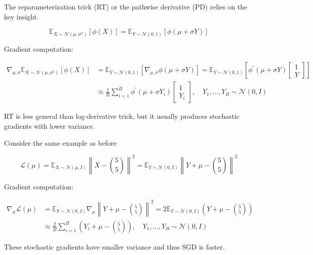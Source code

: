 \begin{definition}
    The reparameterization trick (RT) or the pathwise derivative (PD) relies on the key insight.

    $$
    \mathbb{E}_{X \sim \mathcal{N}\left(\mu, \sigma^{2}\right)}[\phi(X)]=\mathbb{E}_{Y \sim \mathcal{N}(0,1)}[\phi(\mu+\sigma Y)]
    $$

    Gradient computation:

    $$
    \begin{aligned}
    \nabla_{\mu, \sigma} \mathbb{E}_{X \sim \mathcal{N}\left(\mu, \sigma^{2}\right)}[\phi(X)] & =\mathbb{E}_{Y \sim \mathcal{N}(0,1)}\left[\nabla_{\mu, \sigma} \phi(\mu+\sigma Y)\right]=\mathbb{E}_{Y \sim \mathcal{N}(0,1)}\left[\phi^{\prime}(\mu+\sigma Y)\left[\begin{array}{c}
    1 \\
    Y
    \end{array}\right]\right] \\
    & \approx \frac{1}{B} \sum_{i=1}^{B} \phi^{\prime}\left(\mu+\sigma Y_{i}\right)\left[\begin{array}{c}
    1 \\
    Y_{i}
    \end{array}\right], \quad Y_{1}, \ldots, Y_{B} \sim \mathcal{N}(0, I)
    \end{aligned}
    $$

    RT is less general than log-derivative trick, but it usually produces stochastic gradients with lower variance.
\end{definition}

\begin{example}
    Consider the same example as before

    $$
    \mathcal{L}(\mu)=\mathbb{E}_{X \sim \mathcal{N}(\mu, I)}\left\|X-\binom{5}{5}\right\|^{2}=\mathbb{E}_{Y \sim \mathcal{N}(0, I)}\left\|Y+\mu-\binom{5}{5}\right\|^{2}
    $$

    Gradient computation:

    $$
    \begin{aligned}
    \nabla_{\mu} \mathcal{L}(\mu) & =\mathbb{E}_{Y \sim \mathcal{N}(0, I)} \nabla_{\mu}\left\|Y+\mu-\binom{5}{5}\right\|^{2}=2 \mathbb{E}_{Y \sim \mathcal{N}(0, I)}\left(Y+\mu-\binom{5}{5}\right) \\
    & \approx \frac{2}{B} \sum_{i=1}^{B}\left(Y_{i}+\mu-\binom{5}{5}\right), \quad Y_{1}, \ldots, Y_{B} \sim \mathcal{N}(0, I)
    \end{aligned}
    $$

    These stochastic gradients have smaller variance and thus SGD is faster.
\end{example}

